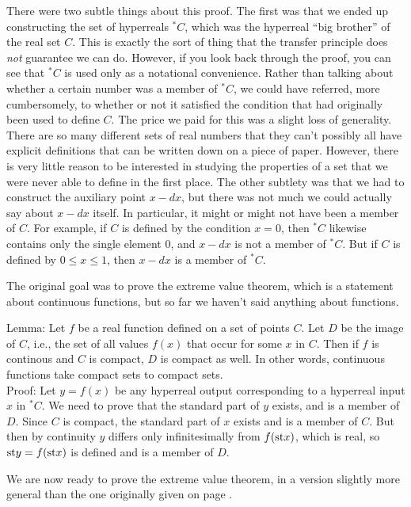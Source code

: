 There were two subtle things about this proof. The first was that we ended up constructing the
set of hyperreals $^{*}C$, which was the hyperreal ``big brother'' of the real set $C$. This
is exactly the sort of thing that the transfer principle does \emph{not} guarantee we can do.
However, if you look back through the proof, you can see that $^{*}C$ is used only as a notational
convenience. Rather than talking about whether a certain number was a member of $^{*}C$, we could
have referred, more cumbersomely, to whether or not it satisfied the condition that had originally
been used to define $C$. The price we paid for this was a slight loss of generality. There are so
many different sets of real numbers that they can't possibly all have explicit definitions that can
be written down on a piece of paper. However, there is very little reason to be interested in
studying the properties of a set that we were never able to define in the first place. The
other subtlety was that we had to construct the auxiliary
point $x-dx$, but there was not much we could actually say about $x-dx$ itself. In particular, it
might or might not have been a member of $C$. For example, if $C$ is defined by the condition $x=0$, then
$^{*}C$ likewise contains only the single element 0, and $x-dx$ is not a member of $^{*}C$.
But if $C$ is defined by $0 \le x \le 1$, then $x-dx$ is a member of $^{*}C$.

The original goal was to prove the extreme value theorem, which is a statement about continuous functions, but so far we haven't said anything about functions.

Lemma: Let $f$ be a real function defined on a set of points $C$. Let $D$ be the image of $C$, i.e.,
the set of all values $f(x)$ that occur for some $x$ in $C$. Then if $f$ is continous and $C$ is
compact, $D$ is compact as well. In other words, continuous functions take compact sets to compact sets.\\
Proof: Let $y=f(x)$ be any hyperreal output corresponding to a hyperreal input $x$ in $^{*}C$.
We need to prove that the standard part of $y$ exists, and is a member of $D$. Since $C$ is compact,
the standard part of $x$ exists and is a member of $C$. But then by continuity $y$ differs only
infinitesimally from $f(\textup{st} x)$, which is real, so $\textup{st} y=f(\textup{st} x)$ is defined and is a member
of $D$.

We are now ready to prove the extreme value theorem, in a version slightly more general than the one
originally given on page \pageref{extreme-value-theorem}.

